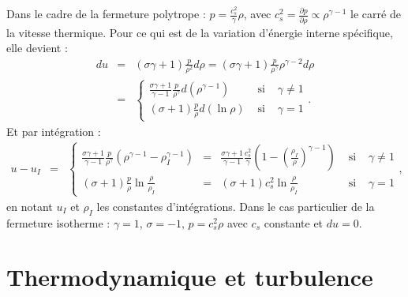 Dans le cadre de la fermeture polytrope : $p = \frac{c_s^2}{\gamma} \rho$, avec $c^2_s = \frac{\partial p}{\partial \rho} \propto \rho^{\gamma-1}$ le carré de la vitesse thermique. Pour ce qui est de la variation d'énergie interne spécifique, elle devient :
\begin{eqnarray}
\label{eq:thermo_pol_du} d u &=& \left(\sigma \gamma+1\right) \frac{p}{\rho^2} d \rho =  \left(\sigma \gamma+1\right) \frac{p}{\rho^{\gamma}} \rho^{\gamma -2} d \rho \\
&=& \left\{ \begin{array}{lcl} \frac{\sigma \gamma+1}{\gamma-1} \frac{p}{\rho^{\gamma}} d\left( \rho^{\gamma-1} \right)  &\textrm{ si }&  \gamma \neq 1\\
\left(\sigma+1\right) \frac{p}{\rho} d \left(\ln{\rho}\right)  &\textrm{ si }&  \gamma = 1
\end{array} \right. .
\end{eqnarray}
Et par intégration :
\begin{eqnarray}
\label{eq:thermo_pol_u} u - u_I &=& \left\{ \begin{array}{lclcl} \frac{\sigma \gamma+1 }{\gamma-1} \frac{p}{\rho^{\gamma}} \left(\rho^{\gamma-1} - \rho_I^{\gamma-1}\right) &=& \frac{\sigma \gamma+1 }{\gamma-1} \frac{c_s^2}{\gamma} \left(1 - \left(\frac{\rho_I}{\rho}\right)^{\gamma-1}\right)  & \textrm{ si } & \gamma \neq 1\\
   \left(\sigma+1\right) \frac{p}{\rho} \ln \frac{\rho}{\rho_I} &=& \left(\sigma+1\right) c_s^2 \ln \frac{\rho}{\rho_I} &\textrm{ si }&  \gamma = 1 
   \end{array} \right. ,
\end{eqnarray} 
en notant $u_I$ et $\rho_I$ les constantes d'intégrations.
Dans le cas particulier de la fermeture isotherme : $\gamma = 1$, $\sigma = -1$, $p = c^2_s \rho$ avec $c_s$ constante et $du = 0$. 

\section{Thermodynamique et turbulence} \label{sec-112bis}

